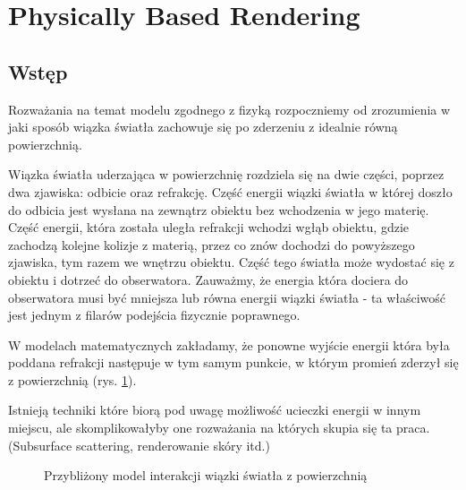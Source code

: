 \documentclass[../main.tex]{subfiles}
\begin{document}
\section{Physically Based Rendering}

\subsection{Wstęp}

Rozważania na temat modelu zgodnego z fizyką rozpoczniemy od zrozumienia w jaki
sposób wiązka światła zachowuje się po zderzeniu z idealnie równą powierzchnią.

Wiązka światła uderzająca w powierzchnię rozdziela się na dwie części, poprzez
dwa zjawiska: odbicie oraz refrakcję. Część energii wiązki światła w której
doszło do odbicia jest wysłana na zewnątrz obiektu bez wchodzenia w jego
materię. Część energii, która została uległa refrakcji wchodzi wgłąb obiektu,
gdzie zachodzą kolejne kolizje z materią, przez co znów dochodzi do powyższego
zjawiska, tym razem we wnętrzu obiektu. Część tego światła może wydostać się
z obiektu i dotrzeć do obserwatora. Zauważmy, że energia która dociera do
obserwatora musi być mniejsza lub równa energii wiązki światła - ta właściwość
jest jednym z filarów podejścia fizycznie poprawnego.

W modelach matematycznych zakładamy, że ponowne wyjście energii która była
poddana refrakcji następuje w tym samym punkcie, w którym promień zderzył się z
powierzchnią (rys. \ref{fig:ReflectionRefraction}).

Istnieją techniki które biorą pod uwagę możliwość ucieczki energii w innym
miejscu, ale skomplikowałyby one rozważania na których skupia się ta praca.
(Subsurface scattering, renderowanie skóry itd.)

\begin{figure}[h]
  \centering
  \caption{Przybliżony model interakcji wiązki światła z powierzchnią}
  \label{fig:ReflectionRefraction}
\end{figure}
\end{document}
